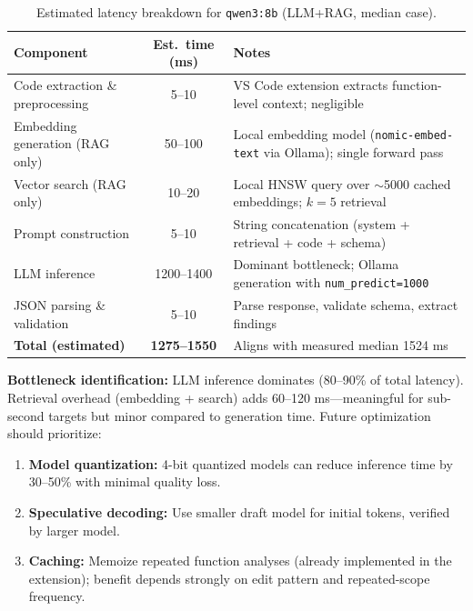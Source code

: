 \begin{table}[H]
  \centering
  \caption{Estimated latency breakdown for \texttt{qwen3:8b} (LLM+RAG, median case).}
  \label{tab:latency-breakdown}
  \small
  \begin{tabular}{lcp{}}
    \toprule
    Component & Est.\ time (ms) & Notes \\
    \midrule
    Code extraction \& preprocessing & 5--10 & VS Code extension extracts function-level context; negligible \\
    Embedding generation (RAG only) & 50--100 & Local embedding model (\texttt{nomic-embed-text} via Ollama); single forward pass \\
    Vector search (RAG only) & 10--20 & Local HNSW query over $\sim$5000 cached embeddings; $k=5$ retrieval \\
    Prompt construction & 5--10 & String concatenation (system + retrieval + code + schema) \\
    LLM inference & 1200--1400 & Dominant bottleneck; Ollama generation with \texttt{num\_predict=1000} \\
    JSON parsing \& validation & 5--10 & Parse response, validate schema, extract findings \\
    \midrule
    \textbf{Total (estimated)} & \textbf{1275--1550} & Aligns with measured median 1524 ms \\
    \bottomrule
  \end{tabular}
\end{table}

\textbf{Bottleneck identification:} LLM inference dominates (80--90\% of total latency). Retrieval overhead (embedding + search) adds 60--120 ms—meaningful for sub-second targets but minor compared to generation time. Future optimization should prioritize:
\begin{enumerate}
  \item \textbf{Model quantization:} 4-bit quantized models can reduce inference time by 30--50\% with minimal quality loss.
  \item \textbf{Speculative decoding:} Use smaller draft model for initial tokens, verified by larger model.
  \item \textbf{Caching:} Memoize repeated function analyses (already implemented in the extension); benefit depends strongly on edit pattern and repeated-scope frequency.
\end{enumerate}

